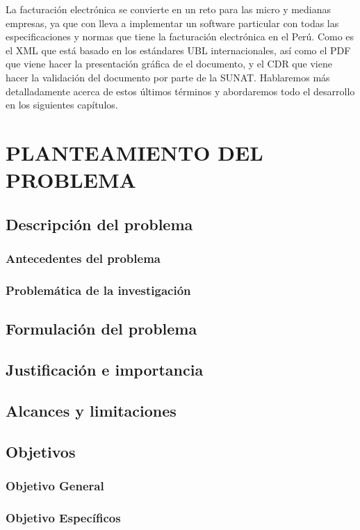 \documentclass[12pt,a4paper,openany,oneside]{book}
\begin{document}
    La facturación electrónica se convierte en un reto para las micro y medianas empresas, ya que con lleva a implementar un software particular con todas las especificaciones y normas que tiene la facturación electrónica en el Perú. Como es el XML que está basado en los estándares UBL internacionales, así como el PDF que viene hacer la presentación gráfica de el documento, y el CDR que viene hacer la validación del documento por parte de la SUNAT. Hablaremos más detalladamente acerca de estos últimos términos y abordaremos todo el desarrollo en los siguientes capítulos.

    \mainmatter
    \chapter{PLANTEAMIENTO DEL PROBLEMA}
        \section{Descripción del problema}
            \subsection{Antecedentes del problema}
            \subsection{Problemática de la investigación}
        \section{Formulación del problema}
        \section{Justificación e importancia}
        \section{Alcances y limitaciones}
        \section{Objetivos}
            \subsection{Objetivo General}
            \subsection{Objetivo Específicos}
\end{document}
